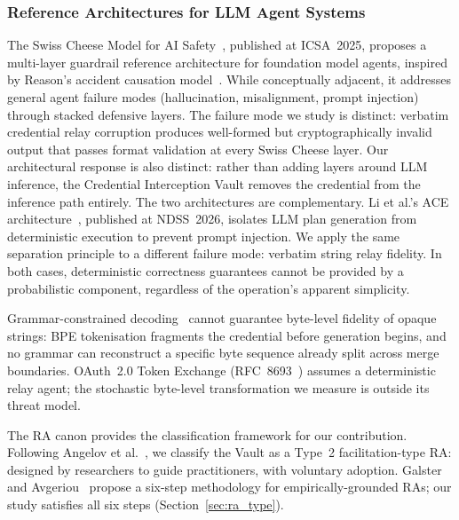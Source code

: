 \subsubsection*{Reference Architectures for LLM Agent Systems}
The Swiss Cheese Model for AI Safety~\cite{shamsujjoha2025swisscheese},
published at ICSA~2025, proposes a multi-layer guardrail reference architecture
for foundation model agents, inspired by Reason's accident causation model~\cite{reason1990human}. While
conceptually adjacent, it addresses general agent failure modes (hallucination,
misalignment, prompt injection) through stacked defensive layers. The failure
mode we study is distinct: verbatim credential relay corruption produces
well-formed but cryptographically invalid output that passes format validation at
every Swiss Cheese layer. Our architectural response is also distinct: rather
than adding layers around LLM inference, the Credential Interception Vault
removes the credential from the inference path entirely. The two architectures
are complementary. Li et al.'s ACE architecture~\cite{li2026ace}, published at
NDSS~2026, isolates LLM plan generation from deterministic execution to prevent
prompt injection. We apply the same separation principle to a different failure
mode: verbatim string relay fidelity. In both cases, deterministic correctness
guarantees cannot be provided by a probabilistic component, regardless of the
operation's apparent simplicity.

Grammar-constrained decoding~\cite{geng2023grammar} cannot guarantee byte-level
fidelity of opaque strings: BPE tokenisation fragments the credential before
generation begins, and no grammar can reconstruct a specific byte sequence
already split across merge boundaries. OAuth~2.0 Token Exchange
(RFC~8693~\cite{rfc8693}) assumes a deterministic relay agent; the stochastic
byte-level transformation we measure is outside its threat model.

The RA canon provides the classification framework for our contribution.
Following Angelov et al.~\cite{angelov2012framework}, we classify the Vault as
a Type~2 facilitation-type RA: designed by researchers to guide practitioners,
with voluntary adoption. Galster and Avgeriou~\cite{galster2011empirically}
propose a six-step methodology for empirically-grounded RAs; our study
satisfies all six steps (Section~\ref{sec:ra_type}).


